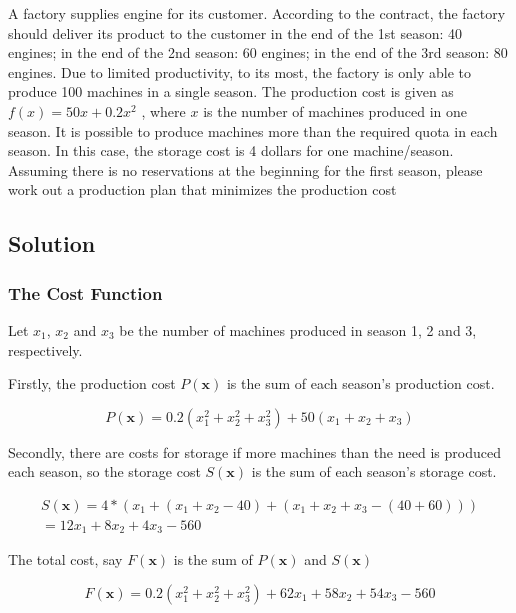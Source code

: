\documentclass[12pt]{article}
\begin{document}
A factory supplies engine for its customer. According to the contract, the
factory should deliver its product to the customer in the end of the 1st season: 40 engines;
in the end of the 2nd season: 60 engines; in the end of the 3rd season: 80 engines. Due
to limited productivity, to its most, the factory is only able to produce 100 machines
in a single season. The production cost is given as $f(x) = 50x + 0.2x^2$
, where $x$ is the
number of machines produced in one season. It is possible to produce machines more
than the required quota in each season. In this case, the storage cost is 4 dollars for one
machine/season. Assuming there is no reservations at the beginning for the first season,
please work out a production plan that minimizes the production cost

\subsection{Solution}

\subsubsection{The Cost Function}

Let $x_1$, $x_2$ and $x_3$ be the number of machines produced in season 1, 2 and 3, respectively.

Firstly, the production cost $P(\mathbf{x})$ is the sum of each season's production cost.

\begin{equation}
	P(\mathbf{x})=0.2(x_1^2+x_2^2+x_3^2)+50(x_1+x_2+x_3)
\end{equation}

Secondly, there are costs for storage if more machines than the need is produced each season, so the storage cost  $S(\mathbf{x})$ is the sum of each season's storage cost.

\begin{equation}
	\begin{aligned}
		S(\mathbf{x})=4*(x_1+(x_1+x_2-40)+(x_1+x_2+x_3-(40+60))) \\
		=12x_1+8x_2+4x_3-560
	\end{aligned}
\end{equation}

The total cost, say $F(\mathbf{x})$ is the sum of $P(\mathbf{x})$ and $S(\mathbf{x})$ 

\begin{equation}
	F(\mathbf{x})=0.2(x_1^2+x_2^2+x_3^2)+62x_1+58x_2+54x_3-560
\end{equation}
\end{document}
